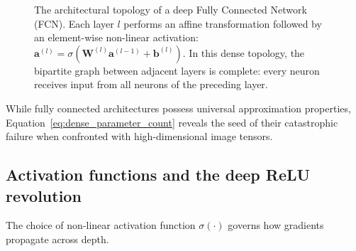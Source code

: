 \begin{figure}[H]
\caption{The architectural topology of a deep Fully Connected Network (FCN). Each layer $l$ performs an affine transformation followed by an element-wise non-linear activation: $\mathbf{a}^{(l)} = \sigma(\mathbf{W}^{(l)} \mathbf{a}^{(l-1)} + \mathbf{b}^{(l)})$. In this dense topology, the bipartite graph between adjacent layers is complete: every neuron receives input from all neurons of the preceding layer.}
\label{fig:fcn_topology}
\end{figure}

While fully connected architectures possess universal approximation properties, Equation~\eqref{eq:dense_parameter_count} reveals the seed of their catastrophic failure when confronted with high-dimensional image tensors.

\subsection{Activation functions and the deep ReLU revolution}
\label{sec:activation_functions_and_relu}

The choice of non-linear activation function $\sigma(\cdot)$ governs how gradients propagate across depth.

